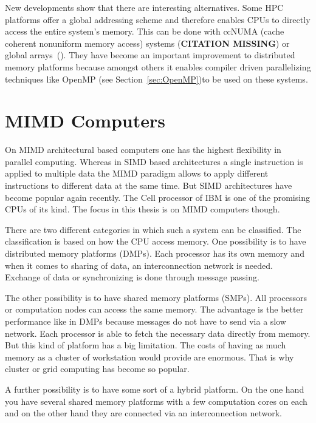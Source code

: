 New developments show that there are interesting alternatives. Some
HPC platforms offer a global addressing scheme and therefore enables
CPUs to directly access the entire system's memory. This can be done
with ccNUMA (cache coherent nonuniform memory access) systems
(\textbf{CITATION MISSING}) or
global arrays~(\cite{nieplocha96gan}). %
They have become an important improvement to distributed memory
platforms because amongst others it enables compiler driven
parallelizing techniques like OpenMP (see Section~\ref{sec:OpenMP})to be
used on these systems. 

\section{MIMD Computers}
\label{sec:mimd_computers}

On MIMD architectural based computers one has the highest flexibility
in parallel computing. Whereas in SIMD based architectures a single
instruction is applied to multiple data the MIMD paradigm allows to
apply different instructions to different data at the same time. But
SIMD architectures have become popular again recently. The Cell
processor of IBM is one of the promising CPUs of its kind. The focus in
this thesis is on MIMD computers though.

There are two different categories in which such a system can be
classified. The classification is based on how the CPU access
memory. One possibility is to have distributed memory platforms (DMPs). Each
processor has its own memory and when it comes to sharing of data, an
interconnection network is needed. Exchange of data or synchronizing
is done through message passing.

The other possibility is to have shared memory platforms (SMPs). All
processors or computation nodes can access the same memory. The
advantage is the better performance like in DMPs because messages do not
have to send via a slow network. Each processor is able to
fetch the necessary data directly from memory. But this kind of platform
has a big limitation. The costs of having as much memory as a cluster
of workstation would provide are enormous. That is why cluster or
grid computing has become so popular.

A further possibility is to have some sort of a hybrid platform. On
the one hand you have several shared memory platforms with a few
computation cores on each and on the other hand they are connected via
an interconnection network. 

